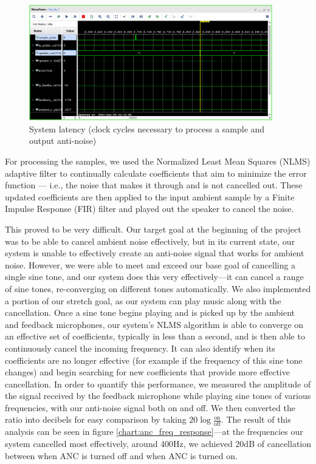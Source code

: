 \documentclass{fpgairpods}
\begin{document}
\begin{figure}
\centering
\includegraphics[width=300pt]{./figs/system_latency_ila.png}
\caption{System latency (clock cycles necessary to process a sample and output anti-noise)}
\label{fig:systemlatency}
\end{figure}

For processing the samples, we used the Normalized Least Mean Squares (NLMS) adaptive filter to continually calculate coefficients that aim to minimize the error function --- i.e., the noise that makes it through and is not cancelled out. These updated coefficients are then applied to the input ambient sample by a Finite Impulse Response (FIR) filter and played out the speaker to cancel the noise. 

This proved to be very difficult. Our target goal at the beginning of the project was to be able to cancel ambient noise effectively, but in its current state, our system is unable to effectively create an anti-noise signal that works for ambient noise. However, we were able to meet and exceed our base goal of cancelling a single sine tone, and our system does this very effectively---it can cancel a range of sine tones, re-converging on different tones automatically. We also implemented a portion of our stretch goal, as our system can play music along with the cancellation. Once a sine tone begins playing and is picked up by the ambient and feedback microphones, our system's NLMS algorithm is able to converge on an effective set of coefficients, typically in less than a second, and is then able to continuously cancel the incoming frequency. It can also identify when its coefficients are no longer effective (for example if the frequency of this sine tone changes) and begin searching for new coefficients that provide more effective cancellation. In order to quantify this performance, we measured the amplitude of the signal received by the feedback microphone while playing sine tones of various frequencies, with our anti-noise signal both on and off. We then converted the ratio into decibels for easy comparison by taking $20\log{\frac{\text{on}}{\text{off}}}$. The result of this analysis can be seen in figure \ref{chart:anc_freq_response}---at the frequencies our system cancelled most effectively, around 400Hz, we achieved 20dB of cancellation between when ANC is turned off and when ANC is turned on.
\end{document}

